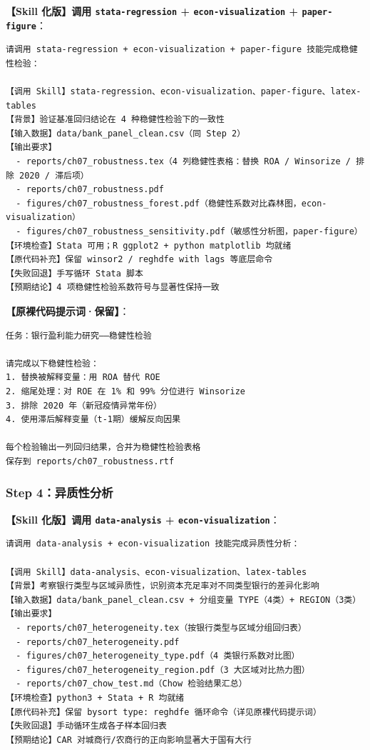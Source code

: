 \textbf{【Skill 化版】调用 \texttt{stata-regression} + \texttt{econ-visualization} + \texttt{paper-figure}}：

\begin{lstlisting}
请调用 stata-regression + econ-visualization + paper-figure 技能完成稳健性检验：

【调用 Skill】stata-regression、econ-visualization、paper-figure、latex-tables
【背景】验证基准回归结论在 4 种稳健性检验下的一致性
【输入数据】data/bank_panel_clean.csv（同 Step 2）
【输出要求】
  - reports/ch07_robustness.tex（4 列稳健性表格：替换 ROA / Winsorize / 排除 2020 / 滞后项）
  - reports/ch07_robustness.pdf
  - figures/ch07_robustness_forest.pdf（稳健性系数对比森林图，econ-visualization）
  - figures/ch07_robustness_sensitivity.pdf（敏感性分析图，paper-figure）
【环境检查】Stata 可用；R ggplot2 + python matplotlib 均就绪
【原代码补充】保留 winsor2 / reghdfe with lags 等底层命令
【失败回退】手写循环 Stata 脚本
【预期结论】4 项稳健性检验系数符号与显著性保持一致
\end{lstlisting}

\textbf{【原裸代码提示词·保留】}：

\begin{lstlisting}
任务：银行盈利能力研究——稳健性检验

请完成以下稳健性检验：
1. 替换被解释变量：用 ROA 替代 ROE
2. 缩尾处理：对 ROE 在 1% 和 99% 分位进行 Winsorize
3. 排除 2020 年（新冠疫情异常年份）
4. 使用滞后解释变量（t-1期）缓解反向因果

每个检验输出一列回归结果，合并为稳健性检验表格
保存到 reports/ch07_robustness.rtf
\end{lstlisting}

\subsubsection{Step 4：异质性分析}

\textbf{【Skill 化版】调用 \texttt{data-analysis} + \texttt{econ-visualization}}：

\begin{lstlisting}
请调用 data-analysis + econ-visualization 技能完成异质性分析：

【调用 Skill】data-analysis、econ-visualization、latex-tables
【背景】考察银行类型与区域异质性，识别资本充足率对不同类型银行的差异化影响
【输入数据】data/bank_panel_clean.csv + 分组变量 TYPE（4类）+ REGION（3类）
【输出要求】
  - reports/ch07_heterogeneity.tex（按银行类型与区域分组回归表）
  - reports/ch07_heterogeneity.pdf
  - figures/ch07_heterogeneity_type.pdf（4 类银行系数对比图）
  - figures/ch07_heterogeneity_region.pdf（3 大区域对比热力图）
  - reports/ch07_chow_test.md（Chow 检验结果汇总）
【环境检查】python3 + Stata + R 均就绪
【原代码补充】保留 bysort type: reghdfe 循环命令（详见原裸代码提示词）
【失败回退】手动循环生成各子样本回归表
【预期结论】CAR 对城商行/农商行的正向影响显著大于国有大行
\end{lstlisting}

